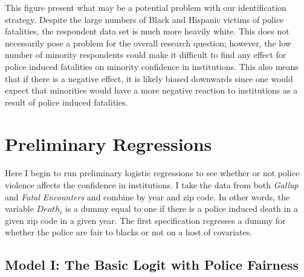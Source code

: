 \documentclass{article}
\begin{document}
This figure present what may be a potential problem with our identification strategy. Despite the large numbers of Black and Hispanic victims of police fatalities, the respondent data set is much more heavily white. This does not necessarily pose a problem for the overall research question; however, the low number of minority respondents could make it difficult to find any effect for   police induced fatalities on minority confidence in institutions. This also means that if there is a negative effect, it is likely biased downwards since one would expect that minorities would have a more negative reaction to institutions as a result of police induced fatalities.  

\section{Preliminary Regressions}

\paragraph{}Here I begin to run preliminary logistic regressions to see whether or not police violence affects the confidence in institutions. I take the data from both \textit{Gallup} and \textit{Fatal Encounters} and combine by year and zip code. In other words, the variable $Death_{i}$ is a dummy equal to one if there is a police induced death in a given zip code in a given year. The first specification regresses a dummy for whether the police are fair to blacks or not on a host of covariates.

\subsection{Model I: The Basic Logit with Police Fairness}
\end{document}
